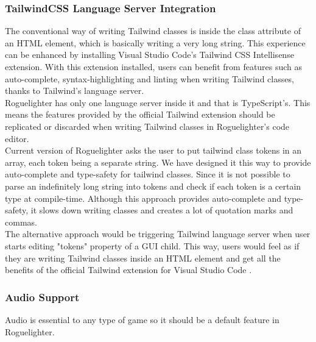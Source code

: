\documentclass{article}
\begin{document}
\subsubsection{TailwindCSS Language Server Integration}
The conventional way of writing Tailwind classes is inside the class attribute of an HTML element, which is basically writing a very long string. This experience can be enhanced by installing Visual Studio Code's Tailwind CSS Intellisense extension. With this extension installed, users can benefit from features such as auto-complete, syntax-highlighting and linting when writing Tailwind classes, thanks to Tailwind's language server.\\

Roguelighter has only one language server inside it and that is TypeScript's. This means the features provided by the official Tailwind extension should be replicated or discarded when writing Tailwind classes in Roguelighter's code editor.\\

Current version of Roguelighter asks the user to put tailwind class tokens in an array, each token being a separate string. We have designed it this way to provide auto-complete and type-safety for tailwind classes. Since it is not possible to parse an indefinitely long string into tokens and check if each token is a certain type at compile-time. Although this approach provides auto-complete and type-safety, it slows down writing classes and creates a lot of quotation marks and commas.\\

The alternative approach would be triggering Tailwind language server when user starts editing "tokens" property of a GUI child. This way, users would feel as if they are writing Tailwind classes inside an HTML element and get all the benefits of the official Tailwind extension for Visual Studio Code \cite{tailwind-vscode}. 
\subsubsection{Audio Support}
Audio is essential to any type of game so it should be a default feature in Roguelighter.
\printbibliography
\listoffigures
\end{document}
